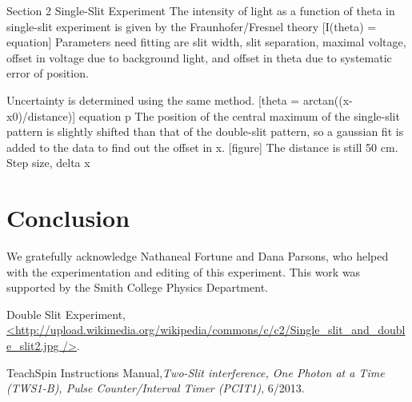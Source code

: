 \documentclass[prb,preprint]{revtex4-1}
\begin{document}
Section 2 Single-Slit Experiment
The intensity of light as a function of theta in single-slit experiment is given by the Fraunhofer/Fresnel theory
[I(theta) = equation]
Parameters need fitting are slit width, slit separation, maximal voltage, offset in voltage due to background light, and offset in theta due to systematic error of position.

Uncertainty is determined using the same method.
[theta = arctan((x-x0)/distance)] {equation p}
The position of the central maximum of the single-slit pattern is slightly shifted than that of the double-slit pattern, so a gaussian fit is added to the data to find out the offset in x.
[figure]
The distance is still 50 cm.
Step size, delta x





\section{Conclusion}



\begin{acknowledgments}

We gratefully acknowledge Nathaneal Fortune and Dana Parsons, who helped with the experimentation and editing of this experiment.  This work was supported by the Smith College Physics Department.

\end{acknowledgments}


\begin{thebibliography}{99}

 Double Slit Experiment, \url{<http://upload.wikimedia.org/wikipedia/commons/c/c2/Single_slit_and_double_slit2.jpg
/>}.

 TeachSpin Instructions Manual,\textit{Two-Slit interference, One Photon at a Time (TWS1-B), Pulse Counter/Interval Timer (PCIT1)}, 6/2013.

\end{thebibliography}

\end{document}
